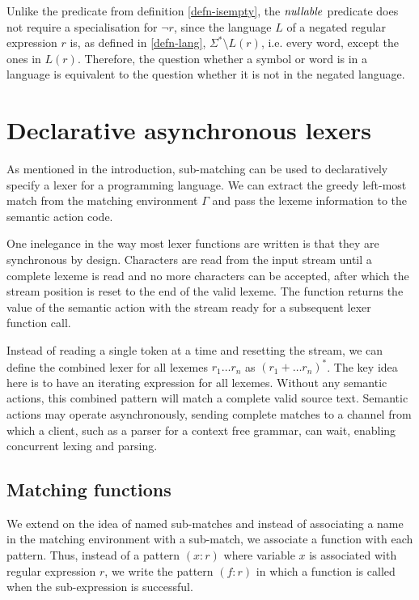 Unlike the predicate from definition \ref{defn-isempty}, the $\mathit{nullable}$
predicate does not require a specialisation for $\neg r$, since the language $L$
of a negated regular expression $r$ is, as defined in \ref{defn-lang}, $\Sigma^*
\setminus L(r)$, i.e. every word, except the ones in $L(r)$. Therefore, the
question whether a symbol or word is in a language is equivalent to the question
whether it is not in the negated language.


\section{Declarative asynchronous lexers}
\label{lexer}

As mentioned in the introduction, sub-matching can be used to declaratively
specify a lexer for a programming language. We can extract the greedy left-most
match from the matching environment $\Gamma$ and pass the lexeme information to
the semantic action code.

One inelegance in the way most lexer functions are written is that they are
synchronous by design. Characters are read from the input stream until a
complete lexeme is read and no more characters can be accepted, after which the
stream position is reset to the end of the valid lexeme. The function returns
the value of the semantic action with the stream ready for a subsequent lexer
function call.

Instead of reading a single token at a time and resetting the stream, we can
define the combined lexer for all lexemes $r_1 \dots r_n$ as $(r_1 + \dots
r_n)^*$. The key idea here is to have an iterating expression for all lexemes.
Without any semantic actions, this combined pattern will match a complete valid
source text. Semantic actions may operate asynchronously, sending complete
matches to a channel from which a client, such as a parser for a context free
grammar, can wait, enabling concurrent lexing and parsing.


\subsection{Matching functions}

We extend on the idea of named sub-matches and instead of associating a name in
the matching environment with a sub-match, we associate a function with each
pattern. Thus, instead of a pattern $(x:r)$ where variable $x$ is associated
with regular expression $r$, we write the pattern $(f:r)$ in which a function is
called when the sub-expression is successful.

